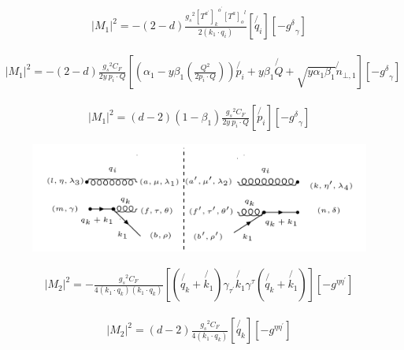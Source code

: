 \begin{equation}
\begin{split}
|M_1|^2=-(2-d)\frac{{g_s}^2 {[T^{a^{\prime}}]_k}^{o^{\prime}} {[T^a]_{o}}^{l}}{2(k_1 \cdot q_i)}[\not{q_i}][-{g^{\delta}}_{\gamma}]
\end{split}
\end{equation}

\begin{equation}
\begin{split}
|M_1|^2=-(2-d)\frac{{g_s}^2 C_F}{2y\:p_i \cdot Q}
[(\alpha_1 -y\beta_1(\frac{Q^2}{2p_i \cdot Q})) \not{p_i} + y\beta_1\not{Q} + \sqrt{y\alpha_1\beta_1}\not{n}_{\bot,1}][-{g^{\delta}}_{\gamma}]
\end{split}
\end{equation}

\begin{equation}
\begin{split}
|M_1|^2=(d-2)(1-\beta_1)\frac{{g_s}^2 C_F}{2y \:p_i \cdot Q}
[  \not{p_i}][-{g^{\delta}}_{\gamma}]
\end{split}
\end{equation}

\pagebreak


\begin{figure}[ht!]
\centering
\includegraphics[scale=0.7]{images/GQ/M2Squer.png}
\end{figure}

\begin{equation}
\begin{split}
|M_2|^2=-\frac{{g_s}^2 C_F}{4(k_1 \cdot q_k)(k_1 \cdot q_k)}[(\not{q_k}+\not{k_1}) {\gamma}_{{\tau}^{\prime}}\not{k_1}{\gamma}^{\tau}(\not{q_k}+\not{k_1})][-g^{{\eta}{\eta}^{\prime}}]
\end{split}
\end{equation}

\begin{equation}
\begin{split}
|M_2|^2=(d-2)\frac{{g_s}^2 C_F}{4(k_1 \cdot q_k)}[\not{q_k}][-g^{{\eta}{\eta}^{\prime}}]
\end{split}
\end{equation}

